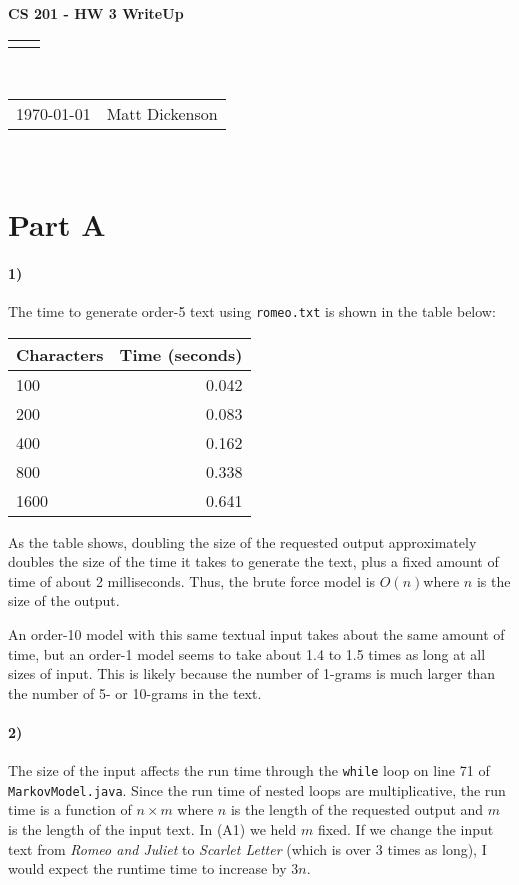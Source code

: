 \documentclass[12pt]{article}
\renewcommand{\title}[1]{\textbf{#1}\\}
\renewcommand{\line}{\begin{tabularx}{\textwidth}{X>{\raggedleft}X}\hline\\\end{tabularx}\\[-0.5cm]}
\newcommand{\leftright}[2]{\begin{tabularx}{\textwidth}{X>{\raggedleft}X}#1%
& #2\\\end{tabularx}\\[-0.5cm]}
\begin{document}
\title{CS 201 - HW 3 WriteUp}
\line
\leftright{\today}{Matt Dickenson} %
\setlength{\parindent}{16pt}

\section*{Part A}

\paragraph{1)} The time to generate order-5 text using \texttt{romeo.txt} is shown in the table below:

\begin{table}[h]
\begin{center}
\begin{tabular}{lr}
Characters & Time (seconds) \\
\hline
100 & 0.042 \\
200 & 0.083 \\
400 & 0.162 \\
800 & 0.338 \\
1600 & 0.641 \\
\end{tabular}
\end{center}
\end{table}

As the table shows, doubling the size of the requested output approximately doubles the size of the time it takes to generate the text, plus a fixed amount of time of about 2 milliseconds. Thus, the brute force model is $O(n)$where $n$ is the size of the output.  

An order-10 model with this same textual input takes about the same amount of time, but an order-1 model seems to take about 1.4 to 1.5 times as long at all sizes of input. This is likely because the number of 1-grams is much larger than the number of 5- or 10-grams in the text. 

\paragraph{2)} The size of the input affects the run time through the \texttt{while} loop on line 71 of \texttt{MarkovModel.java}. Since the run time of nested loops are multiplicative, the run time is a function of $n \times m$ where $n$ is the length of the requested output and $m$ is the length of the input text. In (A1) we held $m$ fixed. If we change the input text from \emph{Romeo and Juliet} to \emph{Scarlet Letter} (which is over 3 times as long), I would expect the runtime time to increase by $3n$. 
\end{document}
